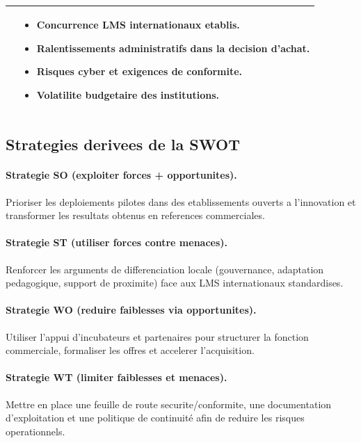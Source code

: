 ﻿﻿\documentclass[12pt,a4paper,oneside]{report}
\begin{document}
\begin{table}[H]
\begin{tabular}{|p{6.2cm}|p{6.2cm}|}
\begin{itemize}
\end{itemize}
&
\begin{itemize}
  \item Concurrence LMS internationaux etablis.
  \item Ralentissements administratifs dans la decision d'achat.
  \item Risques cyber et exigences de conformite.
  \item Volatilite budgetaire des institutions.
\end{itemize}
\\
\hline
\end{tabular}
\end{table}

\subsection{Strategies derivees de la SWOT}

\paragraph{Strategie SO (exploiter forces + opportunites).}
Prioriser les deploiements pilotes dans des etablissements ouverts a l'innovation et transformer les resultats obtenus en references commerciales.

\paragraph{Strategie ST (utiliser forces contre menaces).}
Renforcer les arguments de differenciation locale (gouvernance, adaptation pedagogique, support de proximite) face aux LMS internationaux standardises.

\paragraph{Strategie WO (reduire faiblesses via opportunites).}
Utiliser l'appui d'incubateurs et partenaires pour structurer la fonction commerciale, formaliser les offres et accelerer l'acquisition.

\paragraph{Strategie WT (limiter faiblesses et menaces).}
Mettre en place une feuille de route securite/conformite, une documentation d'exploitation et une politique de continuité afin de reduire les risques operationnels.
\end{document}
